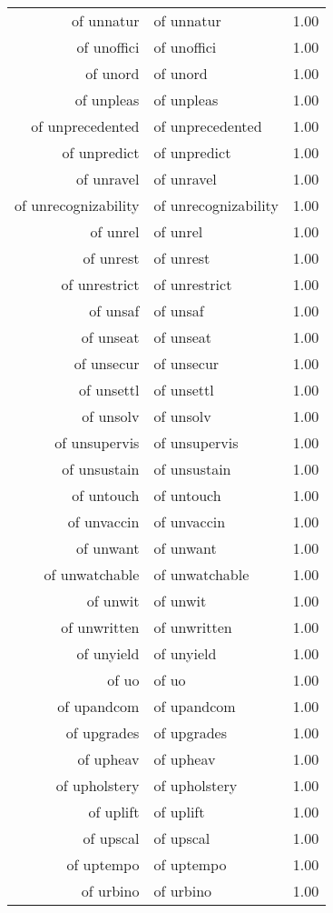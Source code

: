 \begin{table}[ht]
\begin{tabular}{rlr}
  of unnatur & of unnatur & 1.00 \\ 
  of unoffici & of unoffici & 1.00 \\ 
  of unord & of unord & 1.00 \\ 
  of unpleas & of unpleas & 1.00 \\ 
  of unprecedented & of unprecedented & 1.00 \\ 
  of unpredict & of unpredict & 1.00 \\ 
  of unravel & of unravel & 1.00 \\ 
  of unrecognizability & of unrecognizability & 1.00 \\ 
  of unrel & of unrel & 1.00 \\ 
  of unrest & of unrest & 1.00 \\ 
  of unrestrict & of unrestrict & 1.00 \\ 
  of unsaf & of unsaf & 1.00 \\ 
  of unseat & of unseat & 1.00 \\ 
  of unsecur & of unsecur & 1.00 \\ 
  of unsettl & of unsettl & 1.00 \\ 
  of unsolv & of unsolv & 1.00 \\ 
  of unsupervis & of unsupervis & 1.00 \\ 
  of unsustain & of unsustain & 1.00 \\ 
  of untouch & of untouch & 1.00 \\ 
  of unvaccin & of unvaccin & 1.00 \\ 
  of unwant & of unwant & 1.00 \\ 
  of unwatchable & of unwatchable & 1.00 \\ 
  of unwit & of unwit & 1.00 \\ 
  of unwritten & of unwritten & 1.00 \\ 
  of unyield & of unyield & 1.00 \\ 
  of uo & of uo & 1.00 \\ 
  of upandcom & of upandcom & 1.00 \\ 
  of upgrades & of upgrades & 1.00 \\ 
  of upheav & of upheav & 1.00 \\ 
  of upholstery & of upholstery & 1.00 \\ 
  of uplift & of uplift & 1.00 \\ 
  of upscal & of upscal & 1.00 \\ 
  of uptempo & of uptempo & 1.00 \\ 
  of urbino & of urbino & 1.00 \\ 

\end{tabular}
\end{table}
